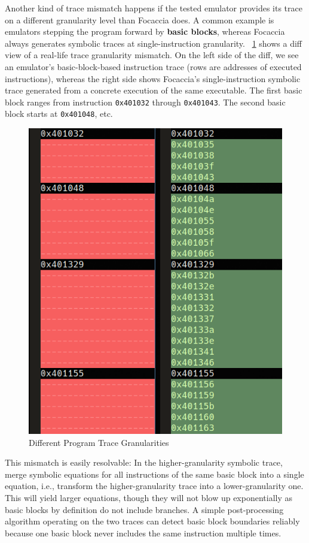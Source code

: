 Another kind of trace mismatch happens if the tested emulator provides its trace on a different granularity level than
Focaccia does. A common example is emulators stepping the program forward by \textbf{basic blocks}, whereas Focaccia
always generates symbolic traces at single-instruction granularity. \figurename~\ref{fig:trace_granularity} shows a diff
view of a real-life trace granularity mismatch. On the left side of the diff, we see an emulator's basic-block-based
instruction trace (rows are addresses of executed instructions), whereas the right side shows Focaccia's
single-instruction symbolic trace generated from a concrete execution of the same executable. The first basic block
ranges from instruction \texttt{0x401032} through \texttt{0x401043}. The second basic block starts at \texttt{0x401048},
etc.

\begin{figure}[htpb]
    \centering
    \includegraphics[width=0.6\linewidth]{figures/trace_diff_view.png}
    \caption{Different Program Trace Granularities}\label{fig:trace_granularity}
\end{figure}

This mismatch is easily resolvable: In the higher-granularity symbolic trace, merge symbolic equations for all
instructions of the same basic block into a single equation, i.e., transform the higher-granularity trace into a
lower-granularity one. This will yield larger equations, though they will not blow up exponentially as basic blocks by
definition do not include branches. A simple post-processing algorithm operating on the two traces can detect basic
block boundaries reliably because one basic block never includes the same instruction multiple times.

